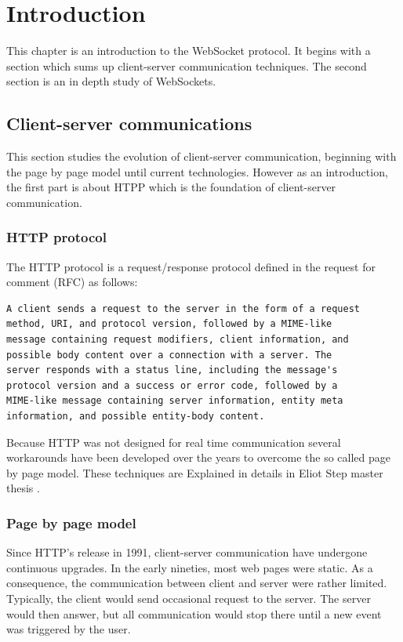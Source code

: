 \chapter{Introduction}
\label{Chapter1}

This chapter is an introduction to the WebSocket protocol.  It begins with a
section which sums up client-server communication techniques.  The second
section is an in depth study of WebSockets.

\section{Client-server communications}

This section studies the evolution of client-server communication, beginning
with the page by page model until current technologies. However as an
introduction, the first part is about HTPP which is the foundation of
client-server communication.

\subsection{HTTP protocol}

The HTTP protocol is a request/response protocol defined in the request for
comment (RFC) \cite{Reference1} as follows:

\begin{verbatim} 
A client sends a request to the server in the form of a request 
method, URI, and protocol version, followed by a MIME-like 
message containing request modifiers, client information, and 
possible body content over a connection with a server. The 
server responds with a status line, including the message's
protocol version and a success or error code, followed by a 
MIME-like message containing server information, entity meta 
information, and possible entity-body content.  
\end{verbatim}

Because HTTP was not designed for real time communication several workarounds
have been developed over the years to overcome the so called page by page
model. These techniques are Explained in details in Eliot Step master thesis
\citep{Reference2}.

\subsection{Page by page model}

Since HTTP's release in 1991, client-server communication have undergone
continuous upgrades. In the early nineties, most web pages were static. As a
consequence, the communication between client and server  were rather limited.
Typically, the client would send occasional request to the server. The server
would then answer, but all communication would stop there until a new event was
triggered by the user. 


